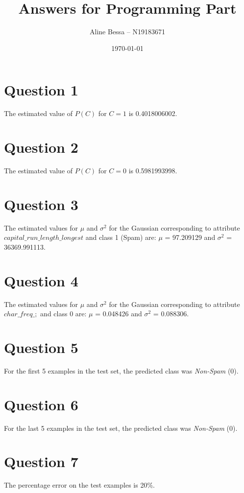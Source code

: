 \documentclass[leqno]{article}
\title{Answers for Programming Part}
\author{Aline Bessa -- N19183671}
\date\today
\begin{document}
\maketitle %

\section*{Question 1} The estimated value of $P(C)$ for $C = 1$ is 0.4018006002.

\hfill

\section*{Question 2} The estimated value of $P(C)$ for $C = 0$ is 0.5981993998.

\hfill

\section*{Question 3} The estimated values for $\mu$ and $\sigma^2$ for the Gaussian corresponding to attribute $capital\_run\_length\_longest$ and 
class 1 (Spam) are: $\mu$  = 97.209129 and $\sigma^2$ = 36369.991113.

\hfill

\section*{Question 4}  The estimated values for $\mu$ and $\sigma^2$ for the Gaussian corresponding to attribute $char\_freq\_;$ and 
class 0 are: $\mu$ = 0.048426 and $\sigma^2$  = 0.088306.

\hfill

\section*{Question 5} For the first 5 examples in the test set, the predicted class was \textit{Non-Spam} (0).

\hfill

\section*{Question 6} For the last 5 examples in the test set, the predicted class was \textit{Non-Spam} (0).


\hfill

\section*{Question 7} The percentage error on the test examples is 20\%.
\end{document}
